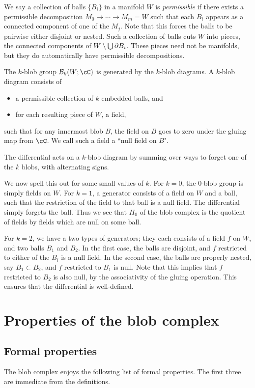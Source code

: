 \documentclass{pnastwo}
\begin{document}
\begin{article}
We say a collection of balls $\{B_i\}$ in a manifold $W$ is \emph{permissible}
if there exists a permissible decomposition $M_0\to\cdots\to M_m = W$ such that
each $B_i$ appears as a connected component of one of the $M_j$. 
Note that this forces the balls to be pairwise either disjoint or nested. 
Such a collection of balls cuts $W$ into pieces, the connected components of $W \setminus \bigcup \partial B_i$. 
These pieces need not be manifolds, but they do automatically have permissible decompositions.

The $k$-blob group $\bc_k(W; \cC)$ is generated by the $k$-blob diagrams. 
A $k$-blob diagram consists of
\begin{itemize}
\item a permissible collection of $k$ embedded balls, and
\item for each resulting piece of $W$, a field,
\end{itemize}
such that for any innermost blob $B$, the field on $B$ goes to zero under the gluing map from $\cC$. 
We call such a field a ``null field on $B$".

The differential acts on a $k$-blob diagram by summing over ways to forget one of the $k$ blobs, with alternating signs.

We now spell this out for some small values of $k$. 
For $k=0$, the $0$-blob group is simply fields on $W$. 
For $k=1$, a generator consists of a field on $W$ and a ball, such that the restriction of the field to that ball is a null field. 
The differential simply forgets the ball. 
Thus we see that $H_0$ of the blob complex is the quotient of fields by fields which are null on some ball.

For $k=2$, we have a two types of generators; they each consists of a field $f$ on $W$, and two balls $B_1$ and $B_2$. 
In the first case, the balls are disjoint, and $f$ restricted to either of the $B_i$ is a null field. 
In the second case, the balls are properly nested, say $B_1 \subset B_2$, and $f$ restricted to $B_1$ is null. 
Note that this implies that $f$ restricted to $B_2$ is also null, by the associativity of the gluing operation. 
This ensures that the differential is well-defined.

\section{Properties of the blob complex}
\subsection{Formal properties}
\label{sec:properties}
The blob complex enjoys the following list of formal properties. The first three are immediate from the definitions.


\end{article}
\end{document}
